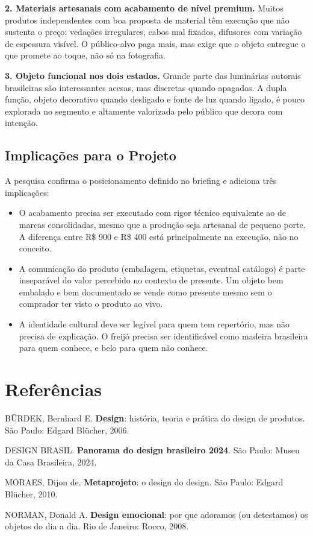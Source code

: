 \documentclass[
  12pt,
  a4paper,
  oneside,
  brazil
]{article}
\let\oldsection\section
\renewcommand{\section}{\clearpage\oldsection}
\providecommand{\tightlist}{\setlength{\itemsep}{0pt}\setlength{\parskip}{0pt}}
\begin{document}
\vspace{0.5em}
\noindent\textbf{2. Materiais artesanais com acabamento de nível premium.} Muitos
produtos independentes com boa proposta de material têm execução que não sustenta o
preço: vedações irregulares, cabos mal fixados, difusores com variação de espessura
visível. O público-alvo paga mais, mas exige que o objeto entregue o que promete ao
toque, não só na fotografia.

\vspace{0.5em}
\noindent\textbf{3. Objeto funcional nos dois estados.} Grande parte das luminárias
autorais brasileiras são interessantes acesas, mas discretas quando apagadas. A dupla
função, objeto decorativo quando desligado e fonte de luz quando ligado, é pouco
explorada no segmento e altamente valorizada pelo público que decora com intenção.

\subsection{Implicações para o Projeto}

A pesquisa confirma o posicionamento definido no briefing e adiciona três implicações:

\begin{itemize}
\tightlist
\item O acabamento precisa ser executado com rigor técnico equivalente ao de marcas
  consolidadas, mesmo que a produção seja artesanal de pequeno porte. A diferença
  entre R\$ 900 e R\$ 400 está principalmente na execução, não no conceito.
\item A comunicação do produto (embalagem, etiquetas, eventual catálogo) é parte
  inseparável do valor percebido no contexto de presente. Um objeto bem embalado e
  bem documentado se vende como presente mesmo sem o comprador ter visto o produto
  ao vivo.
\item A identidade cultural deve ser legível para quem tem repertório, mas não precisa
  de explicação. O freijó precisa ser identificável como madeira brasileira para quem
  conhece, e belo para quem não conhece.
\end{itemize}

\section{Referências}\label{referencias}

BÜRDEK, Bernhard E. \textbf{Design}: história, teoria e prática do design de produtos.
São Paulo: Edgard Blücher, 2006.

DESIGN BRASIL. \textbf{Panorama do design brasileiro 2024}. São Paulo: Museu da Casa
Brasileira, 2024.

MORAES, Dijon de. \textbf{Metaprojeto}: o design do design. São Paulo: Edgard Blücher,
2010.

NORMAN, Donald A. \textbf{Design emocional}: por que adoramos (ou detestamos) os objetos
do dia a dia. Rio de Janeiro: Rocco, 2008.
\end{document}
